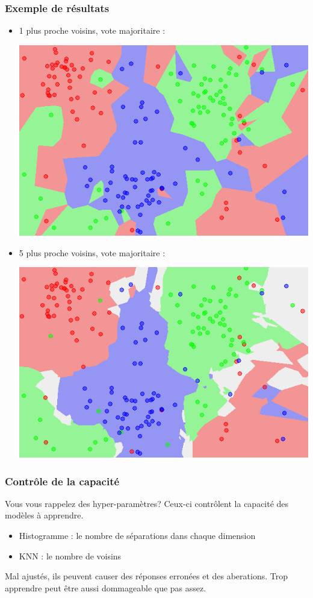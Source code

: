 \documentclass[french]{beamer}
\begin{document}
\begin{frame}
\frametitle{Exemple de résultats}
\begin{itemize}
\item 1 plus proche voisins, vote majoritaire :
\begin{center}
\includegraphics[scale=0.3]{Map1NN.png}
\end{center}

\item 5 plus proche voisins, vote majoritaire :
\begin{center}
\includegraphics[scale=0.3]{Map5NN.png}
\end{center}
\end{itemize}

\end{frame}



\begin{frame}
\frametitle{Contrôle de la capacité}
Vous vous rappelez des hyper-paramètres? Ceux-ci contrôlent la capacité des modèles à apprendre. 

\begin{itemize}
\item Histogramme : le nombre de séparations dans chaque dimension
\item KNN : le nombre de voisins
\end{itemize}

Mal ajustés, ils peuvent causer des réponses erronées et des aberations. Trop apprendre peut être aussi dommageable que pas assez.
\end{frame}
\end{document}

